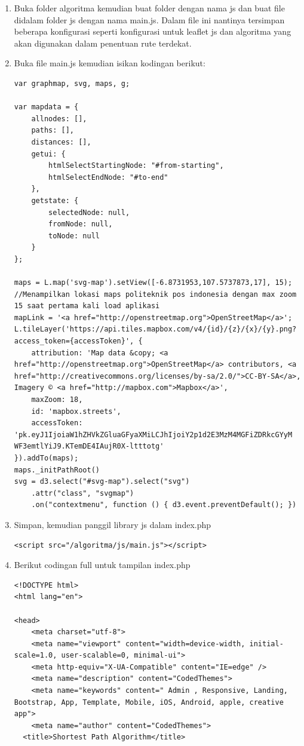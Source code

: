 \begin{enumerate}
	\item Buka folder algoritma kemudian buat folder dengan nama js dan buat file didalam folder js dengan nama main.js. Dalam file ini nantinya tersimpan beberapa konfigurasi seperti konfigurasi untuk leaflet js dan algoritma yang akan digunakan dalam penentuan rute terdekat.
	
	\item Buka file main.js kemudian isikan kodingan berikut:
\begin{lstlisting}[caption=Setting setView Pada Leaflet JS]
var graphmap, svg, maps, g;

var mapdata = {
    allnodes: [],
    paths: [],
    distances: [],
    getui: {
        htmlSelectStartingNode: "#from-starting",
        htmlSelectEndNode: "#to-end"
    },
    getstate: {
        selectedNode: null,
        fromNode: null,
        toNode: null
    }
};

maps = L.map('svg-map').setView([-6.8731953,107.5737873,17], 15);
//Menampilkan lokasi maps politeknik pos indonesia dengan max zoom 15 saat pertama kali load aplikasi
mapLink = '<a href="http://openstreetmap.org">OpenStreetMap</a>';
L.tileLayer('https://api.tiles.mapbox.com/v4/{id}/{z}/{x}/{y}.png?access_token={accessToken}', {
    attribution: 'Map data &copy; <a href="http://openstreetmap.org">OpenStreetMap</a> contributors, <a href="http://creativecommons.org/licenses/by-sa/2.0/">CC-BY-SA</a>, Imagery © <a href="http://mapbox.com">Mapbox</a>',
    maxZoom: 18,
    id: 'mapbox.streets',
    accessToken: 'pk.eyJ1IjoiaW1hZHVkZGluaGFyaXMiLCJhIjoiY2p1d2E3MzM4MGFiZDRkcGYyM WF3emtlYiJ9.KTemDE4IAujR0X-ltttotg'
}).addTo(maps);
maps._initPathRoot()
svg = d3.select("#svg-map").select("svg")
    .attr("class", "svgmap")
    .on("contextmenu", function () { d3.event.preventDefault(); })
\end{lstlisting}

    \item Simpan, kemudian panggil library js dalam index.php
\begin{lstlisting}[caption=Call Library setView]
<script src="/algoritma/js/main.js"></script>
\end{lstlisting}

    \item Berikut codingan full untuk tampilan index.php

\begin{lstlisting}[caption=Pemanggilan Library setView pada index.php]
<!DOCTYPE html>
<html lang="en">

<head>
    <meta charset="utf-8">
    <meta name="viewport" content="width=device-width, initial-scale=1.0, user-scalable=0, minimal-ui">
    <meta http-equiv="X-UA-Compatible" content="IE=edge" />
    <meta name="description" content="CodedThemes">
    <meta name="keywords" content=" Admin , Responsive, Landing, Bootstrap, App, Template, Mobile, iOS, Android, apple, creative app">
    <meta name="author" content="CodedThemes">
  <title>Shortest Path Algorithm</title>
  

\end{lstlisting}
\end{enumerate}
